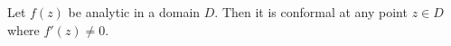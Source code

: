 \documentclass[12pt]{article}
\begin{document}
Let $f(z)$ be analytic in a domain $D$. Then it is conformal at any point $z\in D$ where $f'(z)\neq 0$.
\end{document}
